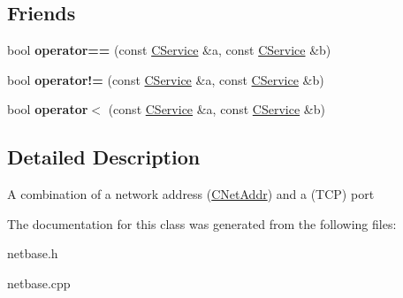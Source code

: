 \subsection*{Friends}
\begin{DoxyCompactItemize}
\item 
\mbox{\label{class_c_service_a7abc2516fa7e015cafcf9b98bc33e2ea}} 
bool {\bfseries operator==} (const \mbox{\hyperlink{class_c_service}{C\+Service}} \&a, const \mbox{\hyperlink{class_c_service}{C\+Service}} \&b)
\item 
\mbox{\label{class_c_service_a5834e0ab5104fffac621ea53fa2c3860}} 
bool {\bfseries operator!=} (const \mbox{\hyperlink{class_c_service}{C\+Service}} \&a, const \mbox{\hyperlink{class_c_service}{C\+Service}} \&b)
\item 
\mbox{\label{class_c_service_a26d0e22a8e7ae213b25467da3556c9e4}} 
bool {\bfseries operator$<$} (const \mbox{\hyperlink{class_c_service}{C\+Service}} \&a, const \mbox{\hyperlink{class_c_service}{C\+Service}} \&b)
\end{DoxyCompactItemize}


\subsection{Detailed Description}
A combination of a network address (\mbox{\hyperlink{class_c_net_addr}{C\+Net\+Addr}}) and a (T\+CP) port 

The documentation for this class was generated from the following files\+:\begin{DoxyCompactItemize}
\item 
netbase.\+h\item 
netbase.\+cpp\end{DoxyCompactItemize}
